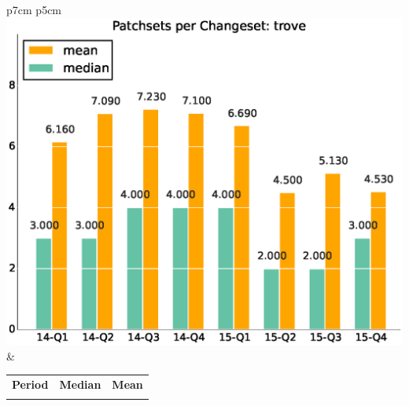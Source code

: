\documentclass[a4wide,11pt]{article}
\begin{document}
\begin{tabular}{p{7cm} p{5cm}}
    \vspace{0pt} 
    \includegraphics[scale=.35]{figs/patchsets_avgtrove.eps}
    & 
    \vspace{0pt}
    \begin{tabular}{l|r|r|}%
    \bfseries Period & \bfseries Median & \bfseries Mean %
    \csvreader[head to column names]{data/scr_patchsets_iterationstrove.csv}{}%
    {\\ & \medianpatchsets & \meanpatchsets}
    \end{tabular}
\end{tabular}
\end{document}
